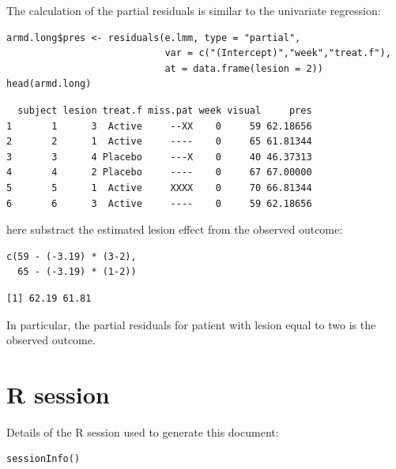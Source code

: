 \documentclass[12pt]{article}
\begin{document}
The calculation of the partial residuals is similar to the univariate regression:
\lstset{language=r,label= ,caption= ,captionpos=b,numbers=none}
\begin{lstlisting}
armd.long$pres <- residuals(e.lmm, type = "partial", 
                            var = c("(Intercept)","week","treat.f"),
                            at = data.frame(lesion = 2))
head(armd.long)
\end{lstlisting}

\begin{verbatim}
  subject lesion treat.f miss.pat week visual     pres
1       1      3  Active     --XX    0     59 62.18656
2       2      1  Active     ----    0     65 61.81344
3       3      4 Placebo     ---X    0     40 46.37313
4       4      2 Placebo     ----    0     67 67.00000
5       5      1  Active     XXXX    0     70 66.81344
6       6      3  Active     ----    0     59 62.18656
\end{verbatim}


here substract the estimated lesion effect from the observed outcome:
\lstset{language=r,label= ,caption= ,captionpos=b,numbers=none}
\begin{lstlisting}
c(59 - (-3.19) * (3-2),
  65 - (-3.19) * (1-2))
\end{lstlisting}

\begin{verbatim}
[1] 62.19 61.81
\end{verbatim}


In particular, the partial residuals for patient with lesion equal to
two is the observed outcome.

\clearpage

\section{R session}
\label{sec:org164cd31}
Details of the R session used to generate this document:
\lstset{language=r,label= ,caption= ,captionpos=b,numbers=none}
\begin{lstlisting}
sessionInfo()
\end{lstlisting}
\end{document}
